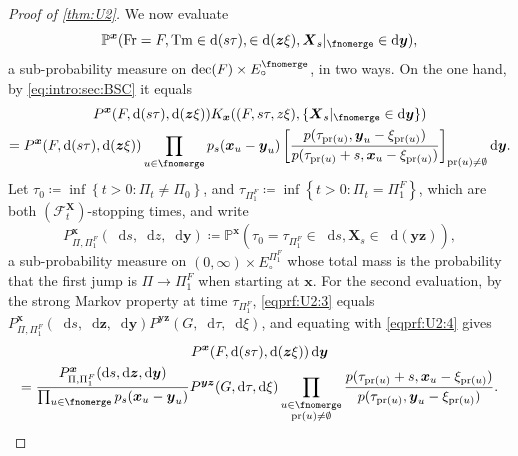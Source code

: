 \documentclass[reqno,draft]{amsart}
\numberwithin{equation}{section}
\theoremstyle{plain}
\theoremstyle{remark}
\renewcommand{\P}{\mathbb{P}} %
\newcommand*\diff{\mathop{}\!\mathrm{d}}
\DeclareMathOperator{\pr}{pr}
\newcommand{\fpart}{\Pi} %
\DeclareMathOperator{\dcb}{dec}
\newcommand{\kbr}{K} %
\DeclareMathOperator{\fr}{Fr}
\DeclareMathOperator{\tm}{Tm}
\let\sp\relax %
\DeclareMathOperator{\sp}{Sp}
\begin{document}
\begin{proof}[Proof of \cref{thm:U2}]
    We now evaluate  %
    \begin{equation}\label{eqprf:U2:3}
        \P^{\boldsymbol x}(\fr = F, \tm \in \diff (s\tau), \sp \in \diff (\boldsymbol z\xi), \boldsymbol X_s \vert_{\fnomerge} \in \diff \boldsymbol y),
    \end{equation}
    a sub-probability measure on $\dcb(F) \times E^{\fnomerge}_\circ $, in two ways. On the one hand, by \cref{eq:intro:sec:BSC} it equals %
    \begin{multline}\label{eqprf:U2:4}
        P^{\boldsymbol x}(F,\diff (s\tau),\diff (\boldsymbol z\xi)) \kbr_{\boldsymbol x}((F,s\tau,z\xi),\{ \boldsymbol X_s \vert_{\fnomerge}\in \diff \boldsymbol y\})\\
        = P^{\boldsymbol x}(F,\diff (s\tau),\diff (\boldsymbol z\xi)) \prod_{u\in \fnomerge} p_s(\boldsymbol x_u-\boldsymbol y_u) \left[ \frac{p(\tau_{\pr(u)},\boldsymbol y_u - \xi_{\pr(u)})}{p(\tau_{\pr(u)}+s,\boldsymbol x_u - \xi_{\pr(u)})} \right] _{\pr(u) \neq \emptyset } \diff \boldsymbol y.
    \end{multline}
    Let $\tau_0 \coloneqq \inf \left\{ t > 0\colon \fpart_t \neq \fpart_0 \right\} $, and $\tau_{\fpart_1^F}\coloneqq \inf \left\{ t > 0\colon \fpart_t = \fpart_1^F \right\} $, which are both $(\mathcal{F}^{\boldsymbol X}_t)$-stopping times, and write \[
        P^{\boldsymbol x}_{\fpart,\fpart_1^F}(\diff s,\diff z,\diff \boldsymbol y) \coloneqq \P^{\boldsymbol x}(\tau_0=\tau_{\fpart_1^F}\in \diff s, \boldsymbol X_s \in \diff (\boldsymbol y\boldsymbol z)),
    \] a sub-probability measure on $(0,\infty)\times E^{\fpart^F_1}_\circ $ whose total mass is the probability that the first jump is $\fpart \to \fpart_1^F$ when starting at $\boldsymbol x$. For the second evaluation, by the strong Markov property at time $\tau_{\fpart_1^F}$, \cref{eqprf:U2:3} equals $P^{\boldsymbol x}_{\fpart,\fpart_1^F}(\diff s,\diff \boldsymbol z,\diff \boldsymbol y) P^{\boldsymbol y\boldsymbol z}(G,\diff \tau,\diff \xi)$, and equating with \cref{eqprf:U2:4} gives
    \begin{multline*}
        P^{\boldsymbol x}(F,\diff (s\tau),\diff (\boldsymbol z\xi))\diff \boldsymbol y \\
        = \frac{P^{\boldsymbol x}_{\fpart,\fpart_1^F}(\diff s,\diff \boldsymbol z,\diff \boldsymbol y)}{\prod_{u\in \fnomerge}p_s(\boldsymbol x_u-\boldsymbol y_u)} P^{\boldsymbol y\boldsymbol z}(G,\diff \tau,\diff \xi) \prod_{\substack{u\in \fnomerge \\ \pr(u) \neq \emptyset } } \frac{p(\tau_{\pr(u)} + s,\boldsymbol x_u - \xi_{\pr(u)})}{p(\tau_{\pr(u)},\boldsymbol y_u-\xi_{\pr(u)})}.

\end{multline*}
\end{proof}
\end{document}
